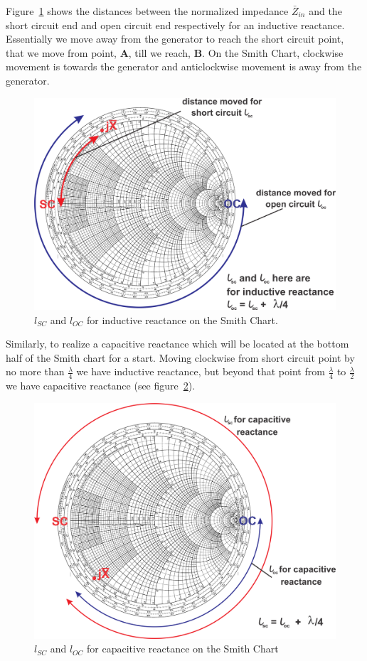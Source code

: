 Figure~\ref{fig:group10diagram7} shows the distances between the normalized impedance $\bar{Z}_{in}$ and the short circuit end and open circuit end respectively for an inductive reactance. Essentially we move away from the generator to reach the short circuit point, that we move from point, \textbf{A}, till we reach, \textbf{B}. On the Smith Chart, clockwise movement is towards the generator and anticlockwise movement is away from the generator.
\begin{figure}[h]
\centering
\includegraphics[scale=0.4]{./graphics/group10diagram7}
\caption{$ l_{SC} $ and $ l_{OC} $ for inductive reactance on the Smith Chart.}
\label{fig:group10diagram7}
\end{figure}

Similarly, to realize a capacitive reactance which will be located at the bottom half of the Smith chart for a start. Moving clockwise from short circuit point by no more than $\frac{\lambda}{4}$ we have inductive reactance, but beyond that point from $\frac{\lambda}{4}$ to $\frac{\lambda}{2}$ we have capacitive reactance (see figure~\ref{fig:group10diagram9}).
\begin{figure}[h]
\centering
\includegraphics[scale=0.4]{./graphics/group10diagram8}
\caption{$ l_{SC} $ and $ l_{OC} $ for capacitive reactance on the Smith Chart}
\label{fig:group10diagram9}
\end{figure}


